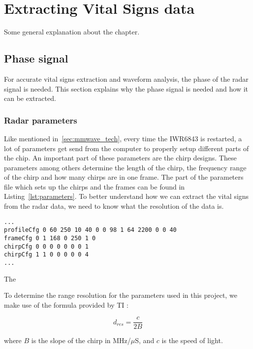 \chapter{Extracting Vital Signs data}
\label{chp:measuring_vital_signs}
Some general explanation about the chapter.

\section{Phase signal}
For accurate vital signs extraction and waveform analysis, the phase of the radar signal is needed. This section explains why the phase signal is needed and how it can be extracted.

\subsection{Radar parameters}
Like mentioned in~\ref{sec:mmwave_tech}, every time the IWR6843 is restarted, a lot of parameters get send from the computer to properly setup different parts of the chip. An important part of these parameters are the chirp designs. These parameters among others determine the length of the chirp, the frequency range of the chirp and how many chirps are in one frame. The part of the parameters file which sets up the chirps and the frames can be found in Listing~\ref{lst:parameters}. To better understand how we can extract the vital signs from the radar data, we need to know what the resolution of the data is.

\begin{lstlisting}[label=lst:parameters, caption=Portion of the parameters file which gets send to the IWR6843 to set it up.]
...
profileCfg 0 60 250 10 40 0 0 98 1 64 2200 0 0 40
frameCfg 0 1 168 0 250 1 0
chirpCfg 0 0 0 0 0 0 0 1
chirpCfg 1 1 0 0 0 0 0 4
...
\end{lstlisting}

The 

To determine the range resolution for the parameters used in this project, we make use of the formula provided by TI \cite{range_est_training_website}:

\begin{equation}
d_{res} = \frac{c}{2 B}
\label{eq:range_res_equation}
\end{equation}

where $B$ is the slope of the chirp in MHz/$\mu$S, and $c$ is the speed of light. 